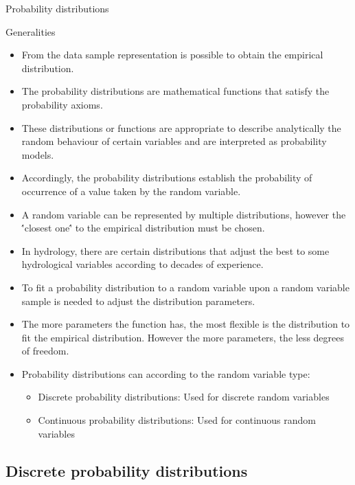 \documentclass[8pt]{beamer}
\begin{document}
\begin{frame}{Probability distributions}
    \begin{block}{Generalities}
        \begin{itemize}
            \item From the data sample representation is possible to obtain the \alert{empirical distribution}. 
            \item The \alert{probability distributions} are mathematical functions that satisfy the probability axioms. 
            \item These distributions or functions are appropriate to describe analytically the random behaviour of certain variables and are interpreted as probability models. 
            \item Accordingly, the probability distributions establish the probability of occurrence of a value taken by the random variable. 
            \item A random variable can be represented by multiple distributions, however the \''closest one\'' to the empirical distribution  must be chosen. 
            \item In hydrology, there are certain distributions that adjust the best to some hydrological variables according to decades of experience. 
            \item To fit a probability distribution to a random variable upon a random variable sample is needed to adjust the distribution \alert{parameters}.
            \item The more parameters the function has, the most flexible is the distribution to fit the empirical distribution. However the more parameters, the less degrees of freedom.
            \item Probability distributions can according to the random variable type:
                \begin{itemize}
                    \item Discrete probability distributions: Used for discrete random variables
                    \item Continuous probability distributions: Used for continuous random variables
                \end{itemize}
        \end{itemize}
    \end{block}

\end{frame}
\subsection{Discrete probability distributions} %
\end{document}
